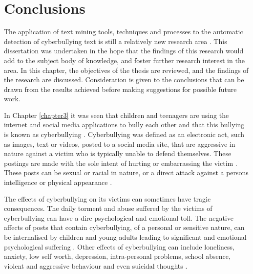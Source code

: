 
\chapter{Conclusions} %

\label{chapter6} 


The application of text mining tools, techniques and processes to the automatic detection of cyberbullying text is still a relatively new research area \cite{xu_fast_2012} \cite{xu_learning_2012}. This dissertation was undertaken in the hope that the findings of this research would add to the subject body of knowledge, and foster further research interest in the area. In this chapter, the objectives of the thesis are reviewed, and the findings of the research are discussed. Consideration is given to the conclusions that can be drawn from the results achieved before making suggestions for possible future work. 

In Chapter \ref{chapter3} it was seen that children and teenagers are using the internet and social media applications to bully each other and that this bullying is known as cyberbullying \cite{dadvar_improved_2012} \cite{kontostathis_detecting_2013}. Cyberbullying was defined as an electronic act, such as images, text or videos, posted to a social media site, that are aggressive in nature against a victim who is typically unable to defend themselves. These postings are made with the sole intent of hurting or embarrassing the victim \cite{nahar_effective_2013} \cite{dadvar_improving_2013}  \cite{dinakar_modeling_2011}. These posts can be sexual or racial in nature, or a direct attack against a persons intelligence or physical appearance \cite{dinakar_common_2012}.

The effects of cyberbullying on its victims can sometimes have tragic consequences. The daily torment and abuse suffered by the victims of cyberbullying can have a dire psychological and emotional toll. The negative affects of posts that contain cyberbullying, of a personal or sensitive nature, can be internalised by children and young adults leading to significant and emotional psychological suffering \cite{dinakar_modeling_2011}. Other effects of cyberbullying can include loneliness, anxiety, low self worth, depression, intra-personal problems, school absence, violent and aggressive behaviour and even suicidal thoughts \cite{xu_fast_2012} \cite{xu_learning_2012}. 

